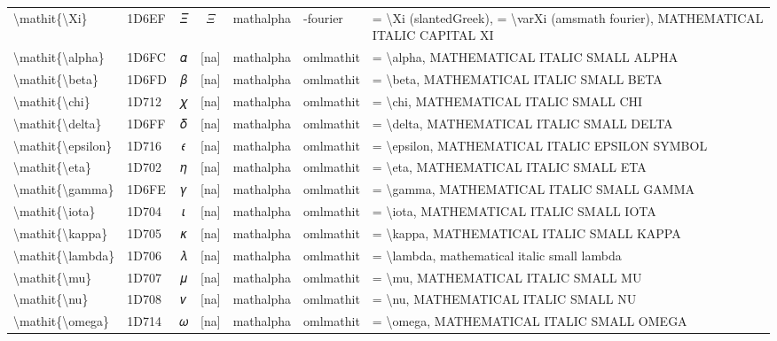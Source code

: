 \documentclass[a4paper,landscape]{article}
\begin{document}
\begin{longtable}{llcclll}
\textbackslash{}mathit\{\textbackslash{}Xi\} & 1D6EF & 𝛯 & $\mathit{\Xi}$ & mathalpha & -fourier & = \textbackslash{}Xi (slantedGreek),  = \textbackslash{}varXi (amsmath fourier),  MATHEMATICAL ITALIC CAPITAL XI \\
\textbackslash{}mathit\{\textbackslash{}alpha\} & 1D6FC & 𝛼 & [na] & mathalpha & omlmathit & = \textbackslash{}alpha,  MATHEMATICAL ITALIC SMALL ALPHA \\
\textbackslash{}mathit\{\textbackslash{}beta\} & 1D6FD & 𝛽 & [na] & mathalpha & omlmathit & = \textbackslash{}beta,  MATHEMATICAL ITALIC SMALL BETA \\
\textbackslash{}mathit\{\textbackslash{}chi\} & 1D712 & 𝜒 & [na] & mathalpha & omlmathit & = \textbackslash{}chi,  MATHEMATICAL ITALIC SMALL CHI \\
\textbackslash{}mathit\{\textbackslash{}delta\} & 1D6FF & 𝛿 & [na] & mathalpha & omlmathit & = \textbackslash{}delta,  MATHEMATICAL ITALIC SMALL DELTA \\
\textbackslash{}mathit\{\textbackslash{}epsilon\} & 1D716 & 𝜖 & [na] & mathalpha & omlmathit & = \textbackslash{}epsilon,  MATHEMATICAL ITALIC EPSILON SYMBOL \\
\textbackslash{}mathit\{\textbackslash{}eta\} & 1D702 & 𝜂 & [na] & mathalpha & omlmathit & = \textbackslash{}eta,  MATHEMATICAL ITALIC SMALL ETA \\
\textbackslash{}mathit\{\textbackslash{}gamma\} & 1D6FE & 𝛾 & [na] & mathalpha & omlmathit & = \textbackslash{}gamma,  MATHEMATICAL ITALIC SMALL GAMMA \\
\textbackslash{}mathit\{\textbackslash{}iota\} & 1D704 & 𝜄 & [na] & mathalpha & omlmathit & = \textbackslash{}iota,  MATHEMATICAL ITALIC SMALL IOTA \\
\textbackslash{}mathit\{\textbackslash{}kappa\} & 1D705 & 𝜅 & [na] & mathalpha & omlmathit & = \textbackslash{}kappa,  MATHEMATICAL ITALIC SMALL KAPPA \\
\textbackslash{}mathit\{\textbackslash{}lambda\} & 1D706 & 𝜆 & [na] & mathalpha & omlmathit & = \textbackslash{}lambda,  mathematical italic small lambda \\
\textbackslash{}mathit\{\textbackslash{}mu\} & 1D707 & 𝜇 & [na] & mathalpha & omlmathit & = \textbackslash{}mu,  MATHEMATICAL ITALIC SMALL MU \\
\textbackslash{}mathit\{\textbackslash{}nu\} & 1D708 & 𝜈 & [na] & mathalpha & omlmathit & = \textbackslash{}nu,  MATHEMATICAL ITALIC SMALL NU \\
\textbackslash{}mathit\{\textbackslash{}omega\} & 1D714 & 𝜔 & [na] & mathalpha & omlmathit & = \textbackslash{}omega,  MATHEMATICAL ITALIC SMALL OMEGA \\

\end{longtable}
\end{document}
